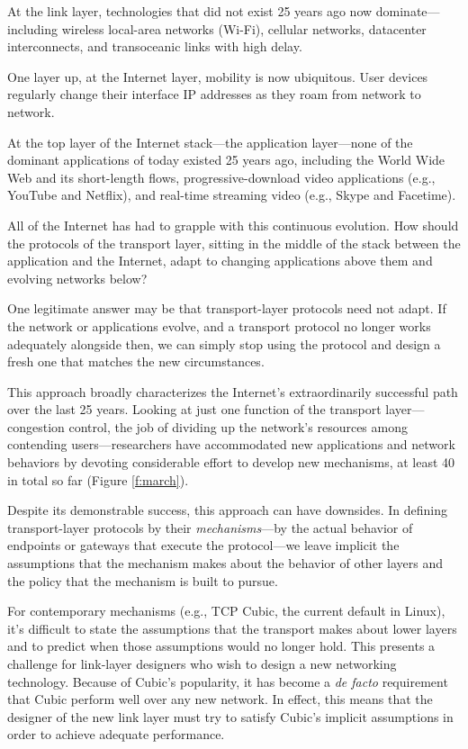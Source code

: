 At the link layer, technologies that did not exist 25 years
ago now dominate---including wireless local-area networks (Wi-Fi),
cellular networks, datacenter interconnects, and transoceanic links
with high delay.

One layer up, at the Internet layer, mobility is now
ubiquitous. User devices regularly change their interface IP addresses
as they roam from network to network.

At the top layer of the Internet stack---the application
layer---none of the dominant applications of today existed 25 years
ago, including the World Wide Web and its short-length flows,
progressive-download video applications (e.g., YouTube and Netflix),
and real-time streaming video (e.g., Skype and Facetime).

All of the Internet has had to grapple with this continuous
evolution. How should the protocols of the transport layer,
sitting in the middle of the stack between the application and the
Internet, adapt to changing applications above them and
evolving networks below?

One legitimate answer may be that transport-layer protocols need not
adapt. If the network or applications evolve, and a transport
protocol no longer works adequately alongside then, we can simply stop
using the protocol and design a fresh one that matches the new
circumstances.

This approach broadly characterizes the Internet's extraordinarily
successful path over the last 25 years. Looking at just one
function of the transport layer---congestion control, the job of
dividing up the network's resources among contending
users---researchers have accommodated new applications and network
behaviors by devoting considerable effort to develop new
mechanisms, at least 40 in total so far (Figure \ref{f:march}).

Despite its demonstrable success, this approach can have downsides. In
defining transport-layer protocols by their \emph{mechanisms}---by the
actual behavior of endpoints or gateways that execute the
protocol---we leave implicit the assumptions that the mechanism makes
about the behavior of other layers and the policy that the mechanism
is built to pursue.

For contemporary mechanisms (e.g., TCP Cubic, the current default in
Linux), it's difficult to state the assumptions that the transport
makes about lower layers and to predict when those assumptions would
no longer hold. This presents a challenge for link-layer designers who
wish to design a new networking technology. Because of Cubic's
popularity, it has become a \emph{de facto} requirement that Cubic perform
well over any new network. In effect, this means that the designer of
the new link layer must try to satisfy Cubic's implicit assumptions in
order to achieve adequate performance.

